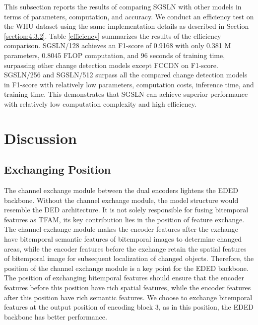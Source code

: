 \documentclass[journal]{IEEEtran}
\begin{document}
This subsection reports the results of comparing SGSLN with other models in terms of parameters, computation, and accuracy. We conduct an efficiency test on the WHU dataset using the same implementation details as described in Section \ref{section:4.3.2}. Table \ref{efficiency} summarizes the results of the efficiency comparison. SGSLN/128 achieves an F1-score of 0.9168 with only 0.381 M parameters, 0.8045 FLOP computation, and 96 seconds of training time, surpassing other change detection models except FCCDN on F1-score. SGSLN/256 and SGSLN/512 surpass all the compared change detection models in F1-score with relatively low parameters, computation costs, inference time, and training time. This demonstrates that SGSLN can achieve superior performance with relatively low computation complexity and  high efficiency.

\section{Discussion}

\subsection{Exchanging Position}

The channel exchange module between the dual encoders lightens the EDED backbone. Without the channel exchange module, the model structure would resemble the DED architecture. It is not solely responsible for fusing bitemporal features as TFAM, its key contribution lies in the position of feature exchange. The channel exchange module makes the encoder features after the exchange have bitemporal semantic features of bitemporal images to determine changed areas, while the encoder features before the exchange retain the spatial features of bitemporal image for subsequent localization of changed objects. Therefore, the position of the channel exchange module is a key point for the EDED backbone. The position of exchanging bitemporal features should ensure that the encoder features before this position have rich spatial features, while the encoder features after this position have rich semantic features. We choose to exchange bitemporal features at the output position of encoding block 3, as in this position, the EDED backbone has better performance.
\end{document}
